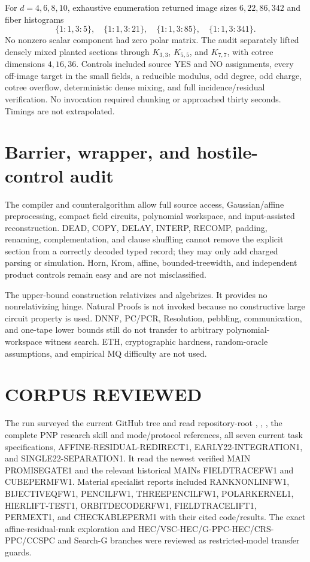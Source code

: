 \documentclass[11pt]{article}
\begin{document}
For $d=4,6,8,10$, exhaustive enumeration returned image sizes
$6,22,86,342$ and fiber histograms
\[
\{1\!:\!1,3\!:\!5\},\quad
\{1\!:\!1,3\!:\!21\},\quad
\{1\!:\!1,3\!:\!85\},\quad
\{1\!:\!1,3\!:\!341\}.
\]
No nonzero scalar component had zero polar matrix.  The audit separately
lifted densely mixed planted sections through $K_{3,3}$, $K_{5,5}$, and
$K_{7,7}$, with cotree dimensions $4,16,36$.  Controls included source YES
and NO assignments, every off-image target in the small fields, a reducible
modulus, odd degree, odd charge, cotree overflow, deterministic dense mixing,
and full incidence/residual verification.  No invocation required chunking or
approached thirty seconds.  Timings are not extrapolated.

\section{Barrier, wrapper, and hostile-control audit}
The compiler and counteralgorithm allow full source access, Gaussian/affine
preprocessing, compact field circuits, polynomial workspace, and
input-assisted reconstruction.  DEAD, COPY, DELAY, INTERP, RECOMP, padding,
renaming, complementation, and clause shuffling cannot remove the explicit
section from a correctly decoded typed record; they may only add charged
parsing or simulation.  Horn, Krom, affine, bounded-treewidth, and independent
product controls remain easy and are not misclassified.

The upper-bound construction relativizes and algebrizes.  It provides no
nonrelativizing hinge.  Natural Proofs is not invoked because no constructive
large circuit property is used.  DNNF, PC/PCR, Resolution, pebbling,
communication, and one-tape lower bounds still do not transfer to arbitrary
polynomial-workspace witness search.  ETH, cryptographic hardness,
random-oracle assumptions, and empirical MQ difficulty are not used.

\section{CORPUS REVIEWED}
The run surveyed the current GitHub tree and read repository-root
, , , the complete PNP research
skill and mode/protocol references, all seven current task specifications,
AFFINE-RESIDUAL-REDIRECT1, EARLY22-INTEGRATION1, and SINGLE22-SEPARATION1.
It read the newest verified MAIN PROMISEGATE1 and the relevant historical
MAINs FIELDTRACEFW1 and CUBEPERMFW1.  Material specialist reports included
RANKNONLINFW1, BIJECTIVEQFW1, PENCILFW1, THREEPENCILFW1, POLARKERNEL1,
HIERLIFT-TEST1, ORBITDECODERFW1, FIELDTRACELIFT1, PERMEXT1, and
CHECKABLEPERM1 with their cited code/results.  The exact affine-residual-rank
exploration and HEC/VSC-HEC/G-PPC-HEC/CRS-PPC/CCSPC and Search-G branches were
reviewed as restricted-model transfer guards.
\end{document}
